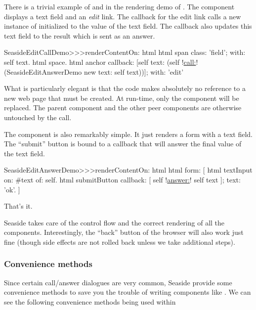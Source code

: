\documentclass[a4paper,10pt,twoside]{book}
\begin{document}
There is a trivial example of  and  in the rendering demo of .
The component  displays a text field and an \emph{edit} link.
The callback for the edit link calls a new instance of  initialized to the value of the text field.
The callback also updates this text field to the result which is sent as an answer.

\begin{code}{}
SeasideEditCallDemo>>>renderContentOn: html 
	html span
		class: 'field';
		with: self text.
	html space.
	html anchor
		callback: [self text: (self !\underline{call:}! (SeasideEditAnswerDemo new text: self text))];
		with: 'edit'
\end{code}{}

What is particularly elegant is that the code makes absolutely no reference to a new web page that must be created.
At run-time, only the  component will be replaced.
The parent component and the other peer components are otherwise untouched by the call.

The  component is also remarkably simple.
It just renders a form with a text field.
The ``submit'' button is bound to a callback that will answer the final value of the text field.

\begin{code}{}
SeasideEditAnswerDemo>>>renderContentOn: html
	html form: [
		html textInput
			on: #text of: self.
		html submitButton
			callback: [ self !\underline{answer:}! self text ];
			text: 'ok'.
		]
\end{code}{}

That's it.

Seaside takes care of the control flow and the correct rendering of all the components.
Interestingly, the ``back'' button of the browser will also work just fine (though side effects are not rolled back unless we take additional steps).

\subsubsection{Convenience methods}

Since certain call/answer dialogues are very common, Seaside provide some convenience methods to save you the trouble of writing components like .
We can see the following convenience methods being used within 
\end{document}
